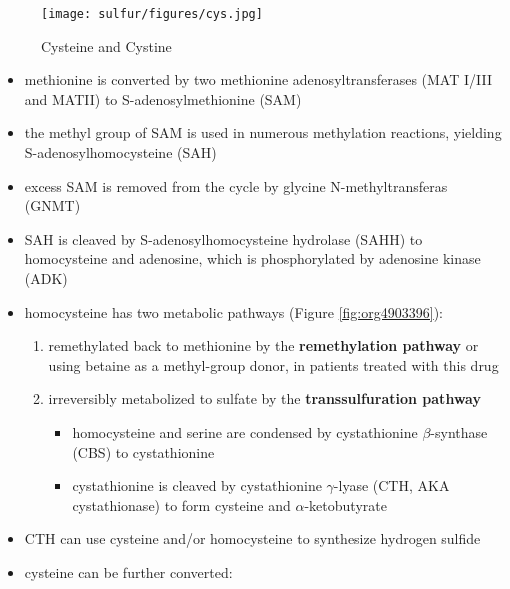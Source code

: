 \documentclass[12pt]{scrartcl}
\begin{document}
\begin{center}
\begin{center}
\begin{center}
\chemnameinit{}
\chemnameinit{}
\hspace{20}
\chemnameinit{}
\hspace{20}
\end{center}


\begin{figure}[htbp]
\centering
\texttt{[image: sulfur/figures/cys.jpg]}
\caption{\label{fig:org26088c4}Cysteine and Cystine}
\end{figure}

\begin{itemize}
\item methionine is converted by two methionine adenosyltransferases (MAT
I/III and MATII) to S-adenosylmethionine (SAM)
\item the methyl group of SAM is used in numerous methylation reactions,
yielding S-adenosylhomocysteine (SAH)
\item excess SAM is removed from the cycle by glycine N-methyltransferas (GNMT)
\item SAH is cleaved by S-adenosylhomocysteine hydrolase (SAHH) to
homocysteine and adenosine, which is phosphorylated by adenosine
kinase (ADK)
\item homocysteine has two metabolic pathways (Figure \ref{fig:org4903396}):
\begin{enumerate}
\item remethylated back to methionine by the \textbf{remethylation pathway} or
using betaine as a methyl-group donor, in patients treated with
this drug
\item irreversibly metabolized to sulfate
by the \textbf{transsulfuration pathway}
\begin{itemize}
\item homocysteine and serine are condensed by cystathionine
\(\beta\)-synthase (CBS) to cystathionine
\item cystathionine is cleaved by cystathionine \(\gamma\)-lyase (CTH, AKA cystathionase) to
form cysteine and \(\alpha\)-ketobutyrate
\end{itemize}
\end{enumerate}
\item CTH can use cysteine and/or homocysteine to synthesize hydrogen
sulfide
\item cysteine can be further converted:

\end{itemize}
\end{center}
\end{center}
\end{document}
